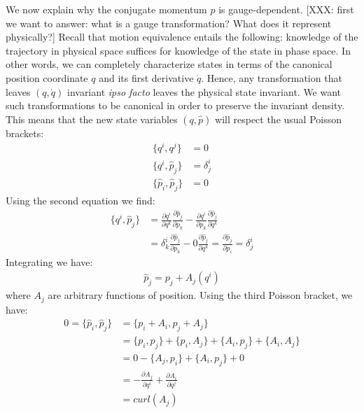 \documentclass[letterpaper]{article}
\begin{document}
We now explain why the conjugate momentum $p$ is gauge-dependent. [XXX: first we want to answer: what is a gauge transformation? What does it represent physically?] Recall that motion equivalence entails the following: knowledge of the trajectory in physical space suffices for knowledge of the state in phase space. In other words, we can completely characterize states in terms of the canonical position coordinate $q$ and its first derivative $\dot{q}$. Hence, any transformation that leaves $(q,\dot{q}) $ invariant \textit{ipso facto} leaves the physical state invariant. We want such transformations to be canonical in order to preserve the invariant density. This means that the new state variables $(q, \hat{p})$ will respect the usual Poisson brackets:
\begin{equation}
\begin{aligned}
	\{q^i, q^j\} &= 0 \\
	\{q^i, \hat{p}_j\} &= \delta^i_j \\
	\{\hat{p}_i, \hat{p}_j\} &= 0
\end{aligned}
\end{equation}
Using the second equation we find:
\begin{equation}
\begin{aligned}
	\{q^i, \hat{p}_j\} &= \frac{\partial q^i}{\partial q^k} \frac{\partial \hat{p}_j}{\partial p_k} - \frac{\partial q^i}{\partial p_k} \frac{\partial \hat{p}_j}{\partial q^k} \\
	&= \delta^i_k \frac{\partial \hat{p}_j}{\partial p_k} - 0 \frac{\partial \hat{p}_j}{\partial q^k} = \frac{\partial \hat{p}_j}{\partial p_i} = \delta^i_j
\end{aligned}
\end{equation}
Integrating we have:
\begin{equation}
\begin{aligned}
\hat{p}_j = p_j + A_j(q^i)
\end{aligned}
\end{equation}
where $A_j$ are arbitrary functions of position. Using the third Poisson bracket, we have:
\begin{equation}
\begin{aligned}
0 = \{\hat{p}_i, \hat{p}_j\} &= \{p_i + A_i, p_j + A_j\} \\
&= \{p_i, p_j \} + \{p_i , A_j\} + \{A_i, p_j \} + \{A_i, A_j\} \\
&= 0 - \{A_j, p_i\} + \{A_i, p_j \} + 0 \\
&= - \frac{\partial A_j}{\partial q^i} + \frac{\partial A_i}{\partial q^j} \\
&= curl(A_j) \\
\end{aligned}
\end{equation}
\end{document}
